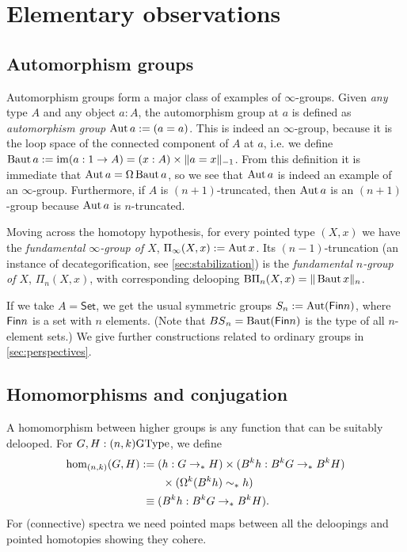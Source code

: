 \section{Elementary observations}
\label{sec:elementary-theory}

\subsection{Automorphism groups}
Automorphism groups form a major class of examples of $\infty$-groups.
Given \emph{any} type $A$ and any object $a : A$, the automorphism group at $a$ is defined as
\emph{automorphism group} $\Aut a:=(a=a)$. 
This is indeed an $\infty$-group, because it is the loop space of the connected component of $A$ at $a$, i.e. we define~$\BAut a := \im(a : 1 \to A) = (x : A) \times \trunc{-1}{a=x}$.
From this definition it is immediate that $\Aut a=\Omega\BAut a$, so we see that $\Aut a$ is indeed an example of an $\infty$-group. 
Furthermore, if $A$ is $(n+1)$-truncated, then $\Aut a$ is an $(n+1)$-group because $\Aut a$ is $n$-truncated.

Moving across the homotopy hypothesis, for every pointed type $(X,x)$
we have the \emph{fundamental $\infty$-group of $X$},
$\Pi_\infty(X,x):=\Aut x$. Its $(n-1)$-truncation (an instance of
decategorification, see \cref{sec:stabilization}) is the
\emph{fundamental $n$-group of $X$}, $\Pi_n(X,x)$,
with corresponding delooping $\mathrm{B}\Pi_n(X,x) = \trunc{n}{\BAut x}$.

If we take $A = \mathsf{Set}$, we get the usual symmetric groups
$\Sym_n := \Aut(\Fin n)$, where $\Fin n$ is a set with $n$
elements. (Note that $\BS_n = \BAut(\Fin n)$ is the type of all
$n$-element sets.)
We give further constructions related to ordinary groups
in \cref{sec:perspectives}.

\subsection{Homomorphisms and conjugation}
\label{sec:homomorphisms}

A homomorphism between higher groups is any
function that can be suitably delooped.
For $G,H : (n,k)\GType$, we define
\begin{align*}
\hom_{(n,k)}(G,H) & := 
(h: G \to_\pt H)\times (B^k h: B^kG \to_\pt B^kH) \\
& \qquad \times (\Omega^k(B^k h) \sim_\pt h) \\
&\phantom{:}\equiv (B^k h: B^kG \to_\pt B^kH).
\end{align*}
For (connective) spectra we need
pointed maps between all the deloopings and pointed homotopies showing
they cohere.

